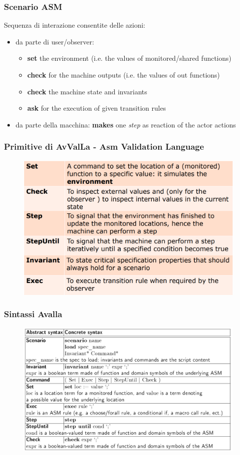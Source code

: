 \subsubsection{Scenario ASM}
Sequenza di interazione consentite delle azioni:
\begin{itemize}
    \item da parte di user/observer: 
    \begin{itemize}
        \item \textbf{set} the environment (i.e. the values of
        monitored/shared functions)
        \item \textbf{check} for the machine outputs (i.e. the values of
        out functions)
        \item \textbf{check} the machine state and invariants
        \item \textbf{ask} for the execution of given transition rules
    \end{itemize}
    \item da parte della macchina: 
    \textbf{makes} one \textit{step} as reaction of the actor actions
\end{itemize}

\subsubsection{Primitive di AvValLa - Asm Validation Language}
\begin{figure}[H]
    \includegraphics[width=0.8\linewidth]{chapters/2/images/Avalla.png}
\end{figure}

\subsubsection{Sintassi Avalla}
\begin{figure}[H]
    \includegraphics[width=0.8\linewidth]{chapters/2/images/sintassiAvalla.png}
\end{figure}